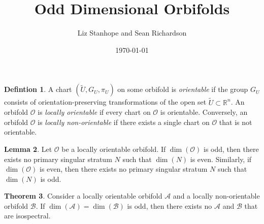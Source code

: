 \documentclass{article}
\theoremstyle{definition}
\newtheorem{theorem}{Theorem}[section]
\newtheorem{lemma}[theorem]{Lemma}
\newtheorem{definition}[theorem]{Defintion}
\begin{document}
\title{Odd Dimensional Orbifolds}
\author{Liz Stanhope and Sean Richardson}
\date{\today}
\maketitle

\section{}

\begin{definition}
    A chart $(\tilde{U},G_U,\pi_U)$ on some orbifold is \emph{orientable} if the group $G_U$ consists of orientation-preserving transformations of the open set $\tilde{U} \subset \mathbb{R}^n$. An orbifold $\mathcal{O}$ is \emph{locally orientable} if every chart on $\mathcal{O}$ is orientable. Conversely, an orbifold $\mathcal{O}$ is \emph{locally non-orientable} if there exists a single chart on $\mathcal{O}$ that is not orientable.
\end{definition}

\begin{lemma}
    Let $\mathcal{O}$ be a locally orientable orbifold. If $\dim(\mathcal{O})$ is odd, then there exists no primary singular stratum $N$ such that $\dim(N)$ is even. Similarly, if $\dim(\mathcal{O})$ is even, then there exists no primary singular stratum $N$ such that $\dim(N)$ is odd.
\end{lemma}

\begin{theorem}
    Consider a locally orientable orbifold $\mathcal{A}$ and a locally non-orientable orbifold $\mathcal{B}$. If $\dim(\mathcal{A}) = \dim(\mathcal{B})$ is odd, then there exists no $\mathcal{A}$ and $\mathcal{B}$ that are isospectral.
\end{theorem}
\end{document}
